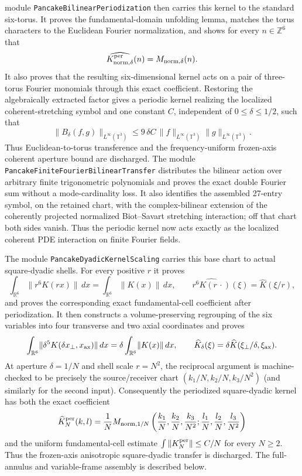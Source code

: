\documentclass[11pt]{article}
\theoremstyle{definition}
\begin{document}
module \texttt{PancakeBilinearPeriodization} then carries this kernel to the
standard six-torus.  It proves the fundamental-domain unfolding lemma,
matches the torus characters to the Euclidean Fourier normalization, and
shows for every $n\in\mathbb Z^6$ that
\[
 \widehat{K^{\rm per}_{\mathrm{norm},\delta}}(n)
   =M_{\mathrm{norm},\delta}(n).
\]
It also proves that the resulting six-dimensional kernel acts on a pair of
three-torus Fourier monomials through this exact coefficient.  Restoring the
algebraically extracted factor gives a periodic kernel realizing the
localized coherent-stretching symbol and one constant $C$, independent of
$0\leq\delta\leq 1/2$, such that
\[
 \|B_\delta(f,g)\|_{L^\infty(\mathbb T^3)}
 \leq 9\,\delta C\,
   \|f\|_{L^\infty(\mathbb T^3)}
   \|g\|_{L^\infty(\mathbb T^3)}.
\]
Thus Euclidean-to-torus transference and the frequency-uniform frozen-axis
coherent aperture bound are discharged.  The module
\texttt{PancakeFiniteFourierBilinearTransfer} distributes the bilinear action
over arbitrary finite trigonometric polynomials and proves the exact double
Fourier sum without a mode-cardinality loss.  It also identifies the assembled
27-entry symbol, on the retained chart, with the complex-bilinear extension
of the coherently projected normalized Biot--Savart stretching interaction;
off that chart both sides vanish.  Thus the periodic kernel now acts exactly
as the localized coherent PDE interaction on finite Fourier fields.

The module \texttt{PancakeDyadicKernelScaling} carries this base chart to
actual square-dyadic shells.  For every positive $r$ it proves
\[
 \int_{\mathbb R^6}\!\|r^6K(rx)\|\,dx
   =\int_{\mathbb R^6}\!\|K(x)\|\,dx,
 \qquad
 \widehat{r^6K(r\,\cdot)}(\xi)=\widehat K(\xi/r),
\]
and proves the corresponding exact fundamental-cell coefficient after
periodization.  It then constructs a volume-preserving regrouping of the six
variables into four transverse and two axial coordinates and proves
\[
 \int_{\mathbb R^6}\!\|\delta^5K(\delta x_\perp,x_{\rm ax})\|\,dx
   =\delta\int_{\mathbb R^6}\!\|K(x)\|\,dx,
 \qquad
 \widehat K_\delta(\xi)
   =\delta\widehat K(\xi_\perp/\delta,\xi_{\rm ax}).
\]
At aperture $\delta=1/N$ and shell scale $r=N^2$, the reciprocal argument is
machine-checked to be precisely the source/receiver chart
$(k_1/N,k_2/N,k_3/N^2)$ (and similarly for the second input).  Consequently
the periodized square-dyadic kernel has both the exact coefficient
\[
 \widehat K_N^{\rm per}(k,l)=\frac1N
 M_{\mathrm{norm},1/N}
 \left(\frac{k_1}{N},\frac{k_2}{N},\frac{k_3}{N^2};
       \frac{l_1}{N},\frac{l_2}{N},\frac{l_3}{N^2}\right)
\]
and the uniform fundamental-cell estimate
$\int\|K_N^{\rm per}\|\leq C/N$ for every $N\geq2$.
Thus the frozen-axis anisotropic square-dyadic transfer is discharged.  The
full-annulus and variable-frame assembly is described below.
\end{document}
